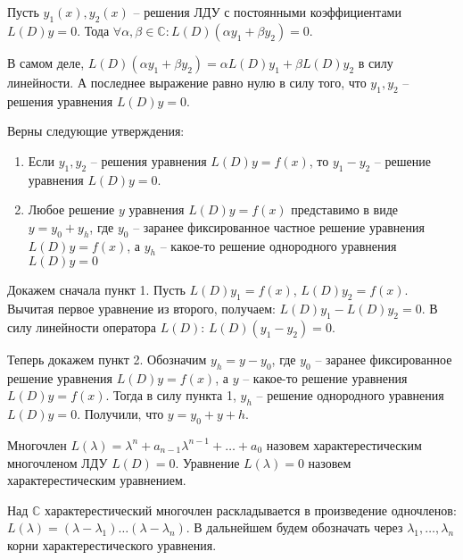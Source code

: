 \documentclass[document.tex]{subfiles}
\begin{document}
\begin{Lemma}
Пусть $y_1(x), y_2(x)$ -- решения ЛДУ с постоянными коэффициентами $L(D)y = 0$. Тода
$\forall \alpha, \beta \in \mathbb{C}: L(D)(\alpha y_1 + \beta y_2) = 0$.
\end{Lemma}
\begin{Proof}
В самом деле, $L(D)(\alpha y_1 + \beta y_2) = \alpha L(D) y_1 + \beta L(D) y_2$ в силу линейности. А последнее выражение равно нулю в силу того, что $y_1, y_2$ -- решения уравнения $L(D)y = 0$.
\end{Proof}
\begin{Theorem}
Верны следующие утверждения:
\begin{enumerate}
\item Если $y_1, y_2$ -- решения уравнения $L(D)y = f(x)$, то $y_1 - y_2$ -- решение уравнения $L(D)y = 0$.
\item Любое решение $y$ уравнения $L(D)y = f(x)$ представимо в виде $y = y_0 + y_h$, где $y_0$ -- заранее фиксированное частное решение уравнения $L(D)y = f(x)$, а $y_h$ -- какое-то решение однородного уравнения $L(D)y = 0$
\end{enumerate}
\end{Theorem}
\begin{Proof}
Докажем сначала пункт 1. Пусть $L(D)y_1 = f(x)$, $L(D)y_2 = f(x)$. Вычитая первое уравнение из второго, получаем: $L(D)y_1 - L(D)y_2 = 0$. В силу линейности оператора $L(D)$: $L(D)(y_1 - y_2) = 0$.

Теперь докажем пункт 2. Обозначим $y_h = y - y_0$, где $y_0$ -- заранее фиксированное решение уравнения $L(D)y = f(x)$, а $y$ -- какое-то решение уравнения $L(D)y = f(x)$. Тогда в силу пункта 1, $y_h$ -- решение однородного уравнения $L(D)y = 0$. Получили, что $y = y_0 + y+h$.
\end{Proof}
\begin{Definition}
Многочлен $L(\lambda) = \lambda^n + a_{n-1} \lambda^{n - 1} + \ldots + a_0$ назовем характерестическим многочленом ЛДУ $L(D) = 0$. Уравнение $L(\lambda) = 0$ назовем характерестическим уравнением.
\end{Definition}

\begin{Remark}
Над $\mathbb{C}$ характерестический многочлен раскладывается в произведение одночленов: $L(\lambda) = (\lambda - \lambda_1)\ldots(\lambda - \lambda_n)$. В дальнейшем будем обозначать через $\lambda_1, \ldots, \lambda_n$ корни характерестического уравнения.
\end{Remark}
\end{document}
